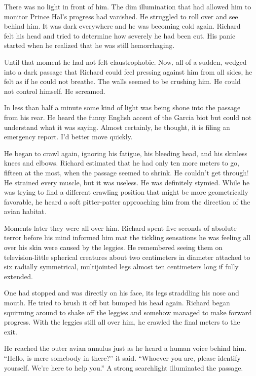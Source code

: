 \documentclass[]{article}
\begin{document}
{There was no light in front of him. The dim illumination that had allowed him to monitor Prince Hal’s progress had vanished. He struggled to roll over and see behind him. It was dark everywhere and he was becoming cold again. Richard felt his head and tried to determine how severely he had been cut. His panic started when he realized that he was still hemorrhaging.

Until that moment he had not felt claustrophobic. Now, all of a sudden, wedged into a dark passage that Richard could feel pressing against him from all sides, he felt as if he could not breathe. The walls seemed to be crushing him. He could not control himself. He screamed.

In less than half a minute some kind of light was being shone into the passage from his rear. He heard the funny English accent of the Garcia biot but could not understand what it was saying. Almost certainly, he thought, it is filing an emergency report. I’d better move quickly.

He began to crawl again, ignoring his fatigue, his bleeding head, and his skinless knees and elbows. Richard estimated that he had only ten more meters to go, fifteen at the most, when the passage seemed to shrink. He couldn’t get through! He strained every muscle, but it was useless. He was definitely stymied. While he was trying to find a different crawling position that might be more geometrically favorable, he heard a soft pitter-patter approaching him from the direction of the avian habitat.

Moments later they were all over him. Richard spent five seconds of absolute terror before his mind informed him mat the tickling sensations he was feeling all over his skin were caused by the leggies. He remembered seeing them on television-little spherical creatures about two centimeters in diameter attached to six radially symmetrical, multijointed legs almost ten centimeters long if fully extended.

One had stopped and was directly on his face, its legs straddling his nose and mouth. He tried to brush it off but bumped his head again. Richard began squirming around to shake off the leggies and somehow managed to make forward progress. With the leggies still all over him, he crawled the final meters to the exit.

He reached the outer avian annulus just as he heard a human voice behind him. “Hello, is mere somebody in there?” it said. “Whoever you are, please identify yourself. We’re here to help you.” A strong searchlight illuminated the passage.

}
\end{document}
